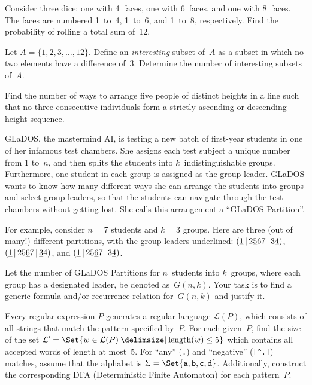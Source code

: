 \documentclass[a4paper,12pt]{article}
\begin{document}
\begin{tasks}[align=right,left=0pt]
    \item Consider three dice: one with 4~faces, one with 6~faces, and one with 8~faces.
    The faces are numbered 1~to~4, 1~to~6, and 1~to~8, respectively.
    Find the probability of rolling a total sum of~12.


    \item Let $A = \{ 1, 2, 3, \dots, 12 \}$.
    Define an \emph{interesting} subset of~$A$ as a subset in which no two elements have a difference of~3.
    Determine the number of interesting subsets of~$A$.


    \item Find the number of ways to arrange five people of distinct heights in a line such that no three consecutive individuals form a strictly ascending or descending height sequence.


    \begingroup
    \item GLaDOS, the mastermind AI, is testing a new batch of first-year students in one of her infamous test chambers.
    She assigns each test subject a unique number from 1 to~$n$, and then splits the students into $k$~indistinguishable groups.
    Furthermore, one student in each group is assigned as the group leader.
    GLaDOS wants to know how many different ways she can arrange the students into groups and select group leaders, so that the students can navigate through the test chambers without getting lost.
    She calls this arrangement a \enquote{GLaDOS Partition}.

    \newcommand*{\leader}[1]{\uline{#1}}
    \newcommand*{\sep}{\,|\,}

    \smallskip
    For example, consider $n = 7$ students and $k = 3$ groups.
    Here are three (out of many!) different partitions, with the group leaders underlined:
    $(\leader{1} \sep 2\leader{5}67 \sep 3\leader{4})$,
    $(\leader{1} \sep 25\leader{6}7 \sep \leader{3}4)$,
    and $(\leader{1} \sep 25\leader{6}7 \sep 3\leader{4})$.

    \smallskip
    Let the number of GLaDOS Partitions for $n$~students into $k$~groups, where each group has a designated leader, be denoted as~$G(n,k)$.
    Your task is to find a generic formula and/or recurrence relation for~$G(n,k)$ and justify it.

    \endgroup


    \item Every regular expression $P$ generates a regular language $\mathcal{L}(P)$, which consists of all strings that match the pattern specified by~$P$.
    For each given~$P$, find the size of the set $\mathcal{L}' =\nobreak \Set{w \in\nobreak \mathcal{L}(P) \given \operatorname{length}(w) \leq 5}$ which contains all accepted words of length at most~5.
    For \enquote{any} (\verb/./) and \enquote{negative} (\verb/[^.]/) matches, assume that the alphabet is $\Sigma = \Set{\texttt{a}, \texttt{b}, \texttt{c}, \texttt{d}}$.
    Additionally, construct the corresponding DFA (Deterministic Finite Automaton) for each pattern~$P$.


\end{tasks}
\end{document}
